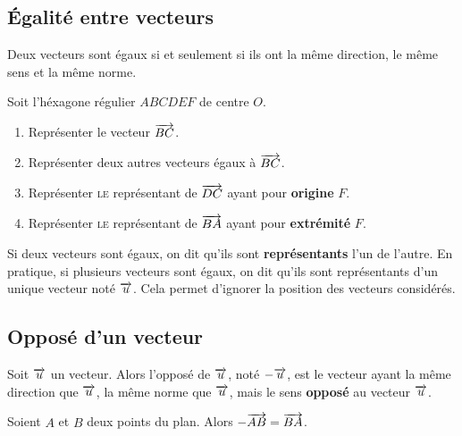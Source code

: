 \documentclass{poly}
\begin{document}
\subsection{Égalité entre vecteurs}
\begin{definition}
Deux vecteurs sont égaux si et seulement si ils ont la même direction, le même sens et la même norme.
\end{definition}
\begin{example}
Soit l'héxagone régulier $ABCDEF$ de centre $O$.
\begin{center}
\end{center}
\begin{enumerate}[label=\emph{\alph*)}]
\item Représenter le vecteur $\overrightarrow{BC}$.
\item Représenter deux autres vecteurs égaux à $\overrightarrow{BC}$.
\item Représenter \textsc{le} représentant de $\overrightarrow{DC}$ ayant pour \textbf{origine} $F$.
\item Représenter \textsc{le} représentant de $\overrightarrow{BA}$ ayant pour \textbf{extrémité} $F$.
\end{enumerate}
\end{example}
\begin{remark}
Si deux vecteurs sont égaux, on dit qu'ils sont \textbf{représentants} l'un de l'autre. En pratique, si plusieurs vecteurs sont égaux, on dit qu'ils sont représentants d'un unique vecteur noté $\overrightarrow{u}$. Cela permet d'ignorer la position des vecteurs considérés.
\end{remark}
\newpage
\subsection{Opposé d'un vecteur}
\begin{definition}
Soit $\overrightarrow{u}$ un vecteur. Alors l'opposé de $\overrightarrow{u}$, noté $- \overrightarrow{u}$, est le vecteur ayant la même direction que $\overrightarrow{u}$, la même norme que $\overrightarrow{u}$, mais le sens \textbf{opposé} au vecteur $\overrightarrow{u}$.  
\end{definition}
\begin{proposition}
Soient $A$ et $B$ deux points du plan. Alors $- \overrightarrow{AB} = \overrightarrow{BA}$.
\end{proposition}
\end{document}
